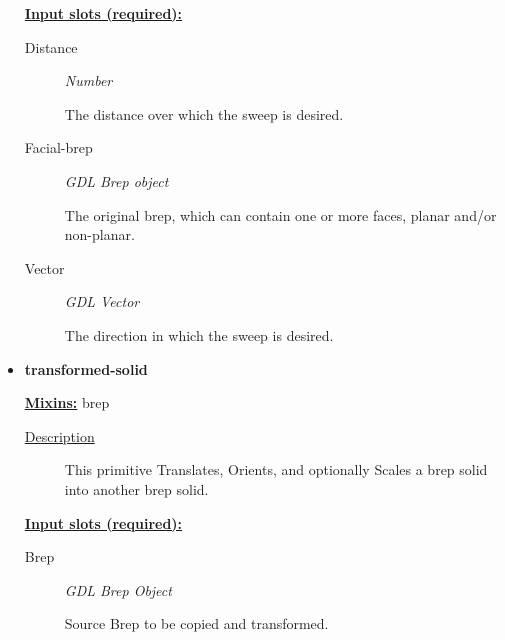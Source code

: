 \documentclass [11pt]{book}
\begin{document}
\begin{itemize}
\textbf{
\underline{Input slots (required):}}

\begin{description}

\item [Distance]
\emph{Number}

 The distance over which the sweep is desired.




\item [Facial-brep]
\emph{GDL Brep object}

 The original brep, which can contain one or more faces, planar and/or non-planar.




\item [Vector]
\emph{GDL Vector}

 The direction in which the sweep is desired.




\end{description}







\item {}
\label{prim:transformed-solid}
\textbf{transformed-solid}


\textbf{
\underline{Mixins:}} brep





\begin{description}

\item [
\underline{Description}]


This primitive Translates, Orients, and optionally Scales a brep solid into another brep solid.



\end{description}








\textbf{
\underline{Input slots (required):}}

\begin{description}

\item [Brep]
\emph{GDL Brep Object}

 Source Brep to be copied and transformed.





\end{description}
\end{itemize}
\end{document}
